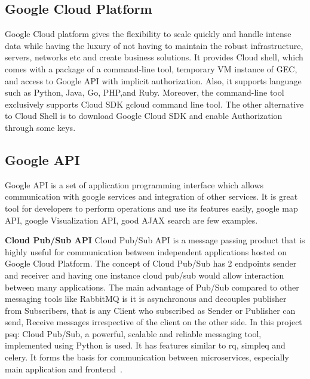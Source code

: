 \subsection{Google Cloud Platform}
Google Cloud platform gives the flexibility to scale quickly and
handle intense data while having the luxury of not having to maintain
the robust infrastructure, servers, networks etc and create business
solutions. It provides Cloud shell, which comes with a package of a
command-line tool, temporary VM instance of GEC, and access to Google
API with implicit authorization. Also, it supports language such as
Python, Java, Go, PHP,and Ruby. Moreover, the command-line tool
exclusively supports Cloud SDK gcloud command line tool. The other
alternative to Cloud Shell is to download Google Cloud SDK and enable
Authorization through some keys.

\subsection{Google API}
Google API is a set of application programming interface which allows
communication with google services and integration of other
services. It is great tool for developers to perform operations and use
its features easily, google map API, google Visualization API, good
AJAX search are few examples.


\item \textbf{Cloud Pub/Sub API} Cloud Pub/Sub API is a message
  passing product that is highly useful for communication between
  independent applications hosted on Google Cloud Platform. The
  concept of Cloud Pub/Sub has 2 endpoints sender and receiver and
  having one instance cloud pub/sub would allow interaction between
  many applications. The main advantage of Pub/Sub compared to other
  messaging tools like RabbitMQ is it is asynchronous and decouples
  publisher from Subscribers, that is any Client who subscribed as
  Sender or Publisher can send, Receive messages irrespective of the
  client on the other side. In this project psq: Cloud Pub/Sub, a
  powerful, scalable and reliable messaging tool, implemented using
  Python is used. It has features similar to rq, simpleq and
  celery. It forms the basis for communication between microservices,
  especially main application and
  frontend~\cite{hid-sp18-602-pub/sub}.

